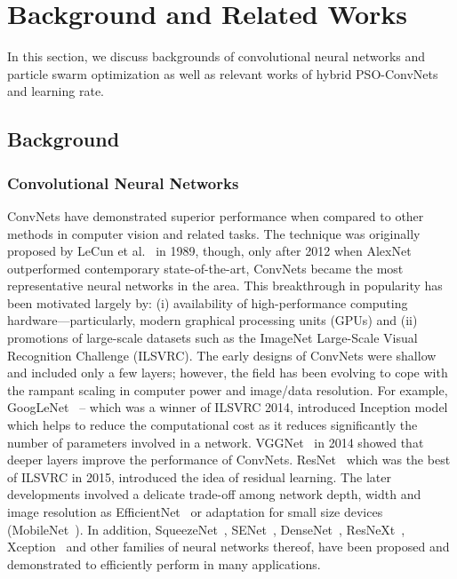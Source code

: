 \documentclass{ieeeaccess}
\begin{document}
\section{Background and Related Works}
\label{sec:background}
In this section, we discuss backgrounds of convolutional neural networks and particle swarm optimization as well as relevant works of hybrid PSO-ConvNets and learning rate.
\subsection{Background}
\subsubsection{Convolutional Neural Networks}
ConvNets have demonstrated superior performance when compared to other methods in computer vision and related tasks. The technique was originally proposed by LeCun et al.~\cite{lecun1989backpropagation} in 1989, though, only after 2012 when AlexNet~\cite{krizhevsky2012imagenet} outperformed contemporary state-of-the-art, ConvNets became the most representative neural networks in the area. This breakthrough in popularity has been motivated largely by: (i) availability of high-performance computing hardware—particularly, modern graphical processing units (GPUs) and (ii) promotions of large-scale datasets such as the ImageNet Large-Scale Visual Recognition Challenge (ILSVRC). The early designs of ConvNets were shallow and included only a few layers; however, the field has been evolving to cope with the rampant scaling in computer power and image/data resolution. For example, GoogLeNet~\cite{szegedy2015going} -- which was a winner of ILSVRC 2014, introduced Inception model which helps to reduce the computational cost as it reduces significantly the number of parameters involved in a network. VGGNet~\cite{simonyan2014very} in 2014 showed that deeper layers improve the performance of ConvNets. ResNet~\cite{he2016deep} which was the best of ILSVRC in 2015, introduced the idea of residual learning. The later developments involved a delicate trade-off among network depth, width and image resolution as EfficientNet~\cite{tan2019efficientnet} or adaptation for small size devices (MobileNet~\cite{howard2017mobilenets}). In addition, SqueezeNet~\cite{iandola2016squeezenet}, SENet~\cite{hu2018squeeze}, DenseNet~\cite{iandola2014densenet}, ResNeXt~\cite{xie2017aggregated}, Xception~\cite{chollet2017xception} and other families of neural networks thereof, have been proposed and demonstrated to efficiently perform in many applications.
\end{document}
